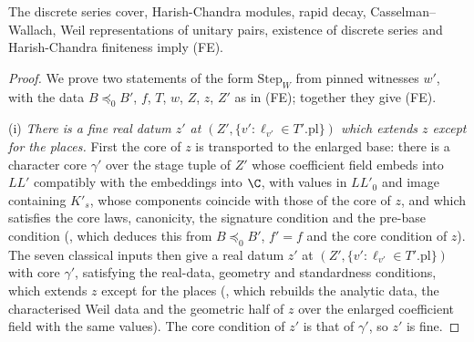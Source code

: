 \begin{lemma}\label{pf:bundles:lem:FE}
The discrete series cover, Harish-Chandra modules, rapid decay, Casselman--Wallach, Weil representations of unitary pairs, existence of
discrete series and Harish-Chandra finiteness imply (FE).
\end{lemma}

\begin{proof}
We prove two statements of the form $\mathrm{Step}_W$ from pinned witnesses $w'$, with the data $B\preceq_0B'$, $f$, $T$, $w$, $Z$, $z$, $Z'$
as in (FE); together they give (FE).

(i) \emph{There is a fine real datum $z'$ at $(Z',\{v':\ell_{v'}\in T'.\mathrm{pl}\})$ which extends $z$ except for the places.} First the core
of $z$ is transported to the enlarged base: there is a character core $\gamma'$ over the stage tuple of $Z'$ whose coefficient field embeds
into $\mathit{LL}'$ compatibly with the embeddings into $\C$, with values in $\mathit{LL}'_0$ and image containing $K'_s$, whose components
coincide with those of the core of $z$, and which satisfies the core laws, canonicity, the signature condition and the pre-base condition
(, which deduces this from $B\preceq_0B'$, $f'=f$ and the core
condition of $z$). The seven classical inputs then give a real datum $z'$ at $(Z',\{v':\ell_{v'}\in T'.\mathrm{pl}\})$ with core $\gamma'$,
satisfying the real-data, geometry and standardness conditions, which extends $z$ except for the places
(, which rebuilds the analytic data, the characterised Weil
data and the geometric half of $z$ over the enlarged coefficient field with the same values). The core condition of $z'$ is that of $\gamma'$, so
$z'$ is fine.


\end{proof}
